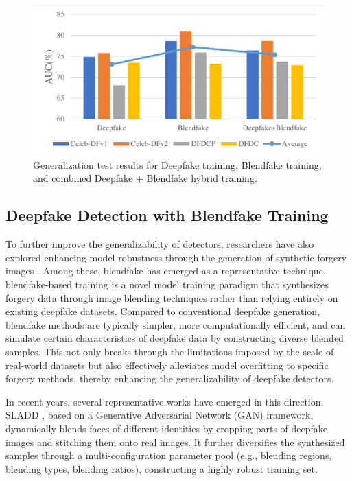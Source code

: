 \documentclass[final,5p,times]{elsarticle}
\begin{document}
\begin{figure}[htb]
\centering
\includegraphics[width=0.75\linewidth]{images/Fig1.pdf}
\caption{Generalization test results for Deepfake training, Blendfake training, and combined Deepfake + Blendfake hybrid training.} 
\label{Fig1}
\end{figure}

\subsection{Deepfake Detection with Blendfake Training}

To further improve the generalizability of detectors, researchers have also explored enhancing model robustness through the generation of synthetic forgery images \cite{14,15,16,17,18}. Among these, blendfake has emerged as a representative technique. blendfake-based training is a novel model training paradigm that synthesizes forgery data through image blending techniques rather than relying entirely on existing deepfake datasets. Compared to conventional deepfake generation, blendfake methods are typically simpler, more computationally efficient, and can simulate certain characteristics of deepfake data by constructing diverse blended samples. This not only breaks through the limitations imposed by the scale of real-world datasets but also effectively alleviates model overfitting to specific forgery methods, thereby enhancing the generalizability of deepfake detectors.

In recent years, several representative works have emerged in this direction. SLADD \cite{16}, based on a Generative Adversarial Network (GAN) framework, dynamically blends faces of different identities by cropping parts of deepfake images and stitching them onto real images. It further diversifies the synthesized samples through a multi-configuration parameter pool (e.g., blending regions, blending types, blending ratios), constructing a highly robust training set.
\end{document}
